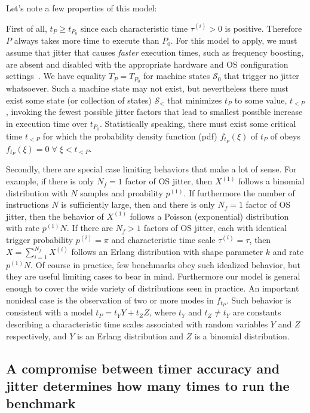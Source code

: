 \documentclass[conference]{IEEEtran}
\begin{document}
Let's note a few properties of this model:

First of all, $t_P \ge t_{P_0}$ since each characteristic time $\tau^{(i)} > 0$ is positive. Therefore $P$ always takes more time to execute than $P_0$.
For this model to apply, we must assume that jitter that causes \textit{faster}
execution times, such as frequency boosting, are absent and disabled with the
appropriate hardware and OS configuration settings~\cite{benchmarktoolschecklist}. We have equality $T_P = T_{P_0}$
for machine states $\mathcal S_0$ that trigger no jitter whatsoever. Such a machine state may not exist, but nevertheless there must exist some state (or collection of states) $\mathcal S_<$ that minimizes $t_P$ to some value, $t_{<P}$, invoking the fewest possible jitter factors that lead to smallest possible increase in execution time over $t_{P_0}$.
Statistically speaking, there must exist some critical time $t_{<P}$ for which the probability density function (pdf) $f_{t_P}(\xi)$ of $t_P$ of obeys $f_{t_P}(\xi) = 0 \; \forall \; \xi < t_{<P}$.

Secondly, there are special case limiting behaviors that make a lot of sense. For example, if there is only $N_f = 1$ factor of OS jitter, then $X^{(1)}$ follows a binomial distribution with $N$ samples and proability $p^{(1)}$. If furthermore the number of instructions $N$ is sufficiently large, then and there is only $N_f = 1$ factor of OS jitter, then the behavior of $X^{(1)}$ follows a Poisson (exponential) distribution with rate $p^{(1)} N$. If there are $N_f > 1$ factors of OS jitter, each with identical trigger probability $p^{(i)} = \pi$ and characteristic time scale $\tau^{(i)} = \tau$, then $X = \sum_{i=1}^{N_f} X^{(i)}$ follows an Erlang distribution with shape parameter $k$ and rate $p^{(1)} N$. Of course in practice, few benchmarks obey such idealized behavior, but they are useful limiting cases to bear in mind. Furthermore our model is general enough to cover the wide variety of distributions seen in practice. An important nonideal case is the observation of two or more modes in $f_{t_P}$. Such behavior is consistent with a model $t_P = t_Y Y + t_Z Z$, where $t_Y$ and $t_Z \ne t_Y$ are constants describing a characteristic time scales associated with random variables $Y$ and $Z$ respectively, and $Y$ is an Erlang distribution and $Z$ is a binomial distribution.



\subsection{A compromise between timer accuracy and jitter determines how many times to run the benchmark}
\end{document}
